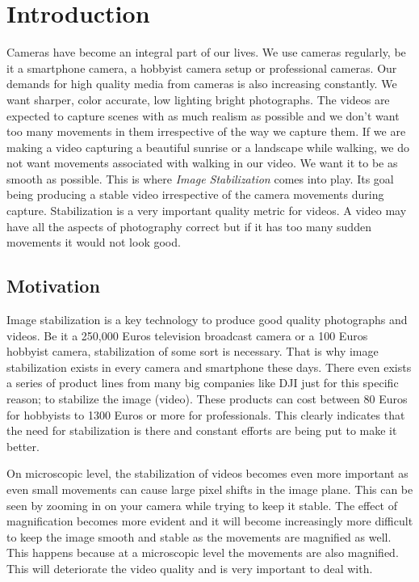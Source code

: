 \chapter{Introduction} \label{chapter_one}

Cameras have become an integral part of our lives. We use cameras regularly, be it a smartphone camera, a hobbyist camera setup or professional cameras. Our demands for high quality media from cameras is also increasing constantly. We want sharper, color accurate, low lighting bright photographs. The videos are expected to capture scenes with as much realism as possible and we don't want too many movements in them irrespective of the way we capture them. If we are making a video capturing a beautiful sunrise or a landscape while walking, we do not want movements associated with walking in our video. We want it to be as smooth as possible. This is where \textit{Image Stabilization} comes into play. Its goal being producing a stable video irrespective of the camera movements during capture. Stabilization is a very important quality metric for videos. A video may have all the aspects of photography correct but if it has too many sudden movements it would not look good.

\section{Motivation}

Image stabilization is a key technology to produce  good quality photographs and videos. Be it a 250,000 Euros television broadcast camera or a 100 Euros hobbyist camera, stabilization of some sort is necessary. That is why image stabilization exists in every camera and smartphone these days. There even exists a series of product lines from many big companies like DJI just for this specific reason; to stabilize the image (video). These products can cost between 80 Euros for hobbyists to 1300 Euros or more for professionals. This clearly indicates that the need for stabilization is there and constant efforts are being put to make it better.

On microscopic level, the stabilization of videos becomes even more important as even small movements can cause large pixel shifts in the image plane. This can be seen by zooming in on your camera while trying to keep it stable. The effect of magnification becomes more evident and it will become increasingly more difficult to keep the image smooth and stable as the movements are magnified as well. This happens because at a microscopic level the movements are also magnified. This will deteriorate the video quality and is very important to deal with. 

